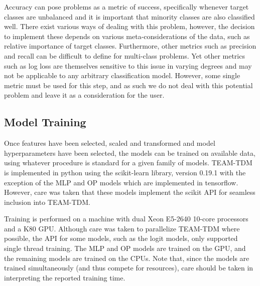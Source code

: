 \documentclass[numbered]{trbunofficial}
\begin{document}
Accuracy can pose problems as a metric of success, specifically whenever target classes are unbalanced and it is important that minority classes are also classified well.
 There exist various ways of dealing with this problem, however, the decision to implement these depends on various meta-considerations of the data, such as relative importance of target classes.
 Furthermore, other metrics such as precision and recall can be difficult to define for multi-class problems. 
 Yet other metrics such as log loss are themselves sensitive to this issue in varying degrees and may not be applicable to any arbitrary classification model.
 However, some single metric must be used for this step, and as such we do not deal with this potential problem and leave it as a consideration for the user.


\subsection{Model Training} \label{subsection:training}

Once features have been selected, scaled and transformed and model hyperparameters have been selected, the models can be trained on available data, using whatever procedure is standard for a given family of models.
 TEAM-TDM is implemented in python using the scikit-learn library, version 0.19.1  with the exception of the MLP and OP models which are implemented in tensorflow.
 However, care was taken that these models implement the scikit API for seamless inclusion into TEAM-TDM.

Training is performed on a machine with dual Xeon E5-2640 10-core processors and a K80 GPU.
 Although care was taken to parallelize TEAM-TDM where possible, the API for some models, such as the logit models, only supported single thread training.
 The MLP and OP models are trained on the GPU, and the remaining models are trained on the CPUs.
 Note that, since the models are trained simultaneously (and thus compete for resources), care should be taken in interpreting the reported training time.
\end{document}
